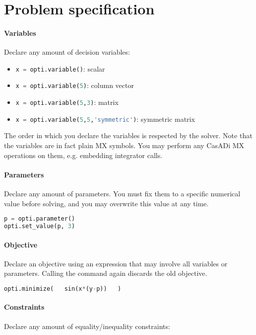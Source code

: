 \documentclass[a4paper,12pt]{book}
\newcommand{\python}[1]{\lstinline[language=Python]{#1}}
\begin{document}
\section{Problem specification}

\paragraph{Variables} Declare any amount of decision variables:\\
\begin{itemize}
  \item[] \python{x = opti.variable()}: scalar
  \item[] \python{x = opti.variable(5)}: column vector
  \item[] \python{x = opti.variable(5,3)}: matrix
  \item[] \python{x = opti.variable(5,5,'symmetric')}: symmetric matrix
\end{itemize}

The order in which you declare the variables is respected by the solver.
Note that the variables are in fact plain MX symbols.
You may perform any CasADi MX operations on them, e.g. embedding integrator calls.

\paragraph{Parameters} Declare any amount of parameters. You must fix them to a specific numerical value before solving, and you may overwrite this value at any time.\\
\begin{lstlisting}[language=Python]
p = opti.parameter()
opti.set_value(p, 3)
\end{lstlisting}


\paragraph{Objective} Declare an objective using an expression that may involve all variables or parameters. Calling the command again discards the old objective.\\
\begin{lstlisting}[language=Python]
opti.minimize(   sin(x*(y-p))   )
\end{lstlisting}

\paragraph{Constraints}
Declare any amount of equality/inequality constraints:
\end{document}
